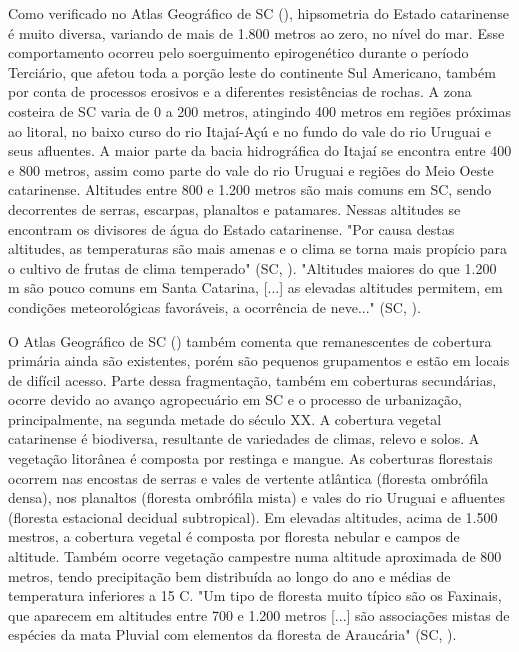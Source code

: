 \indent Como verificado no Atlas Geográfico de \acrlong{SC} (\citeyear{AtlasSCnatureza}), hipsometria do Estado catarinense é muito diversa, variando de mais de 1.800 metros ao zero, no nível do mar. Esse comportamento ocorreu pelo soerguimento epirogenético durante o período Terciário, que afetou toda a porção leste do continente Sul Americano, também por conta de processos erosivos e a diferentes resistências de rochas. A zona costeira de \acrlong{SC} varia de 0 a 200 metros, atingindo 400 metros em regiões próximas ao litoral, no baixo curso do rio Itajaí-Açú e no fundo do vale do rio Uruguai e seus afluentes. A maior parte da bacia hidrográfica do Itajaí se encontra entre 400 e 800 metros, assim como parte do vale do rio Uruguai e regiões do Meio Oeste catarinense. Altitudes entre 800 e 1.200 metros são mais comuns em \acrlong{SC}, sendo decorrentes de serras, escarpas, planaltos e patamares. Nessas altitudes se encontram os divisores de água do Estado catarinense. "Por causa destas altitudes, as temperaturas são mais amenas e o clima se torna mais propício para o cultivo de frutas de clima temperado" (\acrlong{SC}, \citeyear{AtlasSCnatureza}). "Altitudes maiores do que 1.200 m são pouco comuns em Santa Catarina, [...] as elevadas altitudes permitem, em condições meteorológicas favoráveis, a ocorrência de neve..." (\acrlong{SC}, \citeyear{AtlasSCnatureza}).

\indent  O Atlas Geográfico de \acrlong{SC} (\citeyear{AtlasSCnatureza}) também comenta que remanescentes de cobertura primária ainda são existentes, porém são pequenos grupamentos e estão em locais de difícil acesso. Parte dessa fragmentação, também em coberturas secundárias, ocorre devido ao avanço agropecuário em \acrlong{SC} e o  processo de urbanização, principalmente, na segunda metade do século XX. A cobertura vegetal catarinense é biodiversa, resultante de variedades de climas, relevo e solos. A vegetação litorânea é composta por restinga e mangue. As coberturas florestais ocorrem nas encostas de serras e vales de vertente atlântica (floresta ombrófila densa), nos planaltos (floresta ombrófila mista) e vales do rio Uruguai e afluentes (floresta estacional decidual subtropical). Em elevadas altitudes, acima de 1.500 mestros, a cobertura vegetal é composta por floresta nebular e campos de altitude. Também ocorre vegetação campestre numa altitude aproximada de 800 metros, tendo precipitação bem distribuída ao longo do ano e médias de temperatura inferiores a 15 C. "Um tipo de floresta muito típico são os Faxinais, que aparecem em altitudes entre 700 e 1.200 metros [...] são associações mistas de espécies da mata Pluvial com elementos da floresta de Araucária" (\acrlong{SC}, \citeyear{AtlasSCnatureza}).

